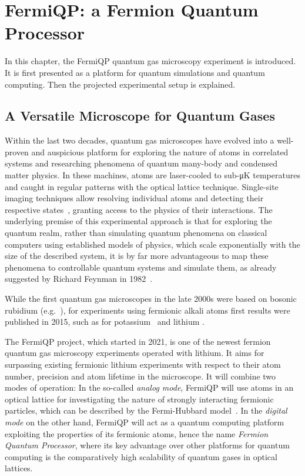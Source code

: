 \renewcommand{\imagepath}{../20-fermiqp/img}

\chapter{FermiQP: a Fermion Quantum Processor}
In this chapter, the FermiQP quantum gas microscopy experiment is introduced. It is first presented as a platform for quantum simulations and quantum computing. Then the projected experimental setup is explained.

\section{A Versatile Microscope for Quantum Gases}
Within the last two decades, quantum gas microscopes have evolved into a well-proven and auspicious platform for exploring the nature of atoms in correlated systems and researching phenomena of quantum many-body and condensed matter physics. In these machines, atoms are laser-cooled to sub-\si[]{\micro\kelvin} temperatures and caught in regular patterns with the optical lattice technique. Single-site imaging techniques allow resolving individual atoms and detecting their respective states~\cite{bloch_many-body_2008,gross_quantum_2017, gross_quantum_2021}, granting access to the physics of their interactions. The underlying premise of this experimental approach is that for exploring the quantum realm, rather than simulating quantum phenomena on classical computers using established models of physics, which scale exponentially with the size of the described system, it is by far more advantageous to map these phenomena to controllable quantum systems and simulate them, as already suggested by Richard Feynman in 1982~\cite{feynman_simulating_1982}.

While the first quantum gas microscopes in the late 2000s were based on bosonic rubidium (e.g.~\cite{sherson_single-atom-resolved_2010}), for experiments using fermionic alkali atoms  first results were published in 2015, such as for potassium~\cite{cheuk_quantum-gas_2015} and lithium \cite{parsons_site-resolved_2015, omran_microscopic_2015}.

The FermiQP project, which started in 2021, is one of the newest fermion quantum gas microscopy experiments operated with lithium. It aims for surpassing existing fermionic lithium experiments with respect to their atom number, precision and atom lifetime in the microscope. It will combine two modes of operation: In the so-called \textit{analog mode}, FermiQP will use atoms in an optical lattice for investigating the nature of strongly interacting fermionic particles, which can be described by the Fermi-Hubbard model~\cite{hubbard_electron_1963, esslinger_fermi-hubbard_2010}. In the \textit{digital mode} on the other hand, FermiQP will act as a quantum computing platform exploiting the properties of its fermionic atoms, hence the name \textit{Fermion Quantum Processor}, where its key advantage over other platforms for quantum computing is the comparatively high scalability of quantum gases in optical lattices.

